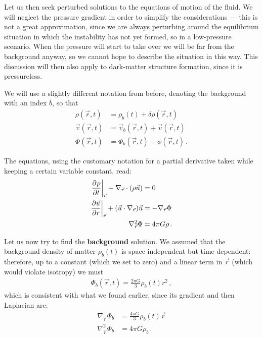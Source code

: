 \documentclass[main.tex]{subfiles}
\begin{document}
Let us then seek perturbed solutions to the equations of motion of the fluid.
We will neglect the pressure gradient in order to simplify the considerations --- this is not a great approximation, since we are always perturbing around the equilibrium situation in which the instability has not yet formed, so in a low-pressure scenario. When the pressure will start to take over we will be far from the background anyway, so we cannot hope to describe the situation in this way. 
This discussion will then also apply to dark-matter structure formation, since it is pressureless.

We will use a slightly different notation from before, denoting the background with an index \(b\), so that 
%
\begin{align}
\rho (\vec{r}, t) &= \rho _b (t) + \delta \rho (\vec{r}, t)  \\
\vec{v} (\vec{r}, t) &= \vec{v}_b (\vec{r}, t) + \vec{v} (\vec{r}, t)  \\
\Phi (\vec{r}, t) &= \Phi _b (\vec{r}, t) + \phi (\vec{r}, t)
\,.
\end{align}

The equations, using the customary notation for a partial derivative taken while keeping a certain variable constant, read:
%
\begin{align}
  \eval{\pdv[]{\rho }{t}}_{\vec{r}} + \nabla_{\vec{r}} \cdot \qty(\rho \vec{u}) &= 0 \\ 
  \eval{\pdv{\vec{u}}{r}}_{\vec{r}} + \qty(\vec{u} \cdot \nabla_{\vec{r}}) \vec{u} &= - \nabla_{\vec{r}} \Phi \\
  \nabla^2_{\vec{r}} \Phi  &= 4 \pi G \rho 
\,.
\end{align}


Let us now try to find the \textbf{background} solution. We assumed that the background density of matter \(\rho _b(t)\) is space independent but time dependent: therefore, up to a constant (which we set to zero) and a linear term in \(\vec{r}\) (which would violate isotropy) we must
%
\begin{align}
  \Phi_{b } (\vec{r}, t) = \frac{2 \pi G}{3} \rho_{b} (t) r^2
\,,
\end{align}
%
which is consistent with what we found earlier, since its gradient and then Laplacian are:
%
\begin{align}
  \nabla_{\vec{r}} \Phi_{b} &= \frac{4 \pi G}{3} \rho_b (t) \vec{r} \\
  \nabla^2_{\vec{r}} \Phi_{b} &= 4 \pi G \rho_b
\,.
\end{align}
\end{document}

